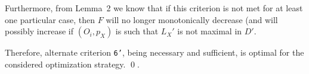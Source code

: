 Furthermore, from Lemma~2 we know that if this criterion is not
met for at least one particular case, then $F$ will no longer
monotonically decrease (and will possibly increase if $(O_i,p_X)$ is
such that $L_X'$ is not maximal in $D'$.

Therefore, alternate criterion \texttt{6'}, being necessary and
sufficient, is optimal for the considered optimization strategy.
\hfill\qed.\\
